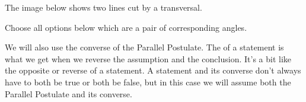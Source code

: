 \documentclass{ximera}
\begin{document}
\begin{question}
The image below shows two lines cut by a transversal.
\begin{image}
\end{image}
Choose all options below which are a pair of corresponding angles.
\begin{selectAll}

\end{selectAll}
\end{question}

We will also use the converse of the Parallel Postulate. The  of a statement is what we get when we reverse the assumption and the conclusion. It's a bit like the opposite or reverse of a statement. A statement and its converse don't always have to both be true or both be false, but in this case we will assume both the Parallel Postulate and its converse.
\end{document}

